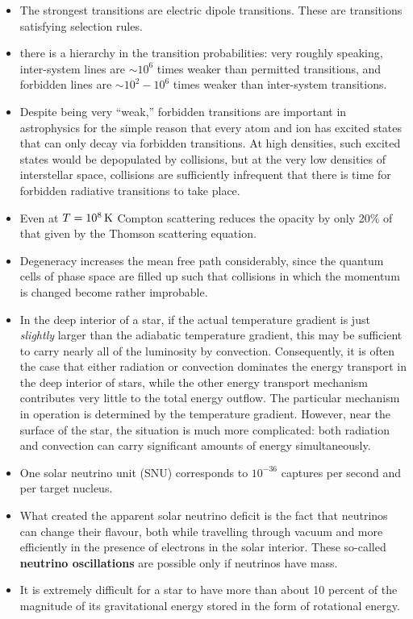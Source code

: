 \documentclass[a4paper,10pt]{article}
\begin{document}
\begin{itemize}
    \item The strongest transitions are electric dipole transitions. These are transitions satisfying selection rules.
    \item there is a hierarchy in the transition probabilities: very roughly speaking, inter-system lines are $\sim10^6$ times weaker than permitted transitions, and forbidden lines are $\sim10^2-10^6$ times weaker than inter-system transitions.
    \item Despite being very ``weak,'' forbidden transitions are important in astrophysics for the simple reason that every atom and ion has excited states that can only decay via forbidden transitions. At high densities, such excited states would be depopulated by collisions, but at the very low densities of interstellar space, collisions are sufficiently infrequent that there is time for forbidden radiative transitions to take place.
    \item Even at $T=10^8\,{\rm K}$ Compton scattering reduces the opacity by only 20\% of that given by the Thomson scattering equation.
    \item Degeneracy increases the mean free path considerably, since the quantum cells of phase space are filled up such that collisions in which the momentum is changed become rather improbable.
    \item In the deep interior of a star, if the actual temperature gradient is just \textit{slightly} larger than the adiabatic temperature gradient, this may be sufficient to carry nearly all of the luminosity by convection. Consequently, it is often the case that either radiation or convection dominates the energy transport in the deep interior of stars, while the other energy transport mechanism contributes very little to the total energy outflow. The particular mechanism in operation is determined by the temperature gradient. However, near the surface of the star, the situation is much more complicated: both radiation and convection can carry significant amounts of energy simultaneously.
    \item One solar neutrino unit (SNU) corresponds to $10^{-36}$ captures per second and per target nucleus.
    \item What created the apparent solar neutrino deficit is the fact that neutrinos can change their flavour, both while travelling through vacuum and more efficiently in the presence of electrons in the solar interior. These so-called \textbf{neutrino oscillations} are possible only if neutrinos have mass.
    \item It is extremely difficult for a star to have more than about 10 percent of the magnitude of its gravitational energy stored in the form of rotational energy.

\end{itemize}
\end{document}
